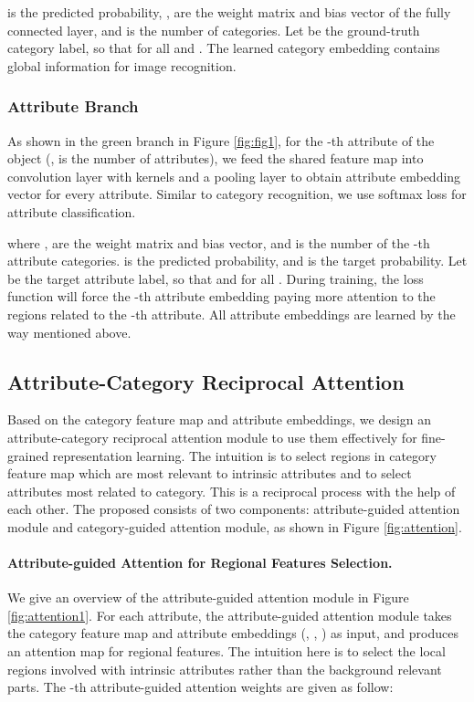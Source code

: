\documentclass[sigconf]{acmart}
\begin{document}
 is the predicted probability, ,  are the weight matrix and bias vector of the fully connected layer, and  is the number of categories. Let  be the ground-truth category label, so that  for all  and . The learned category embedding  contains global information for image recognition.

\vspace{-0.03cm}
\subsubsection{Attribute Branch}
As shown in the green branch in Figure \ref{fig:fig1}, for the -th attribute of the object (,  is the number of attributes), we feed the shared feature map into convolution layer with   kernels and a pooling layer to obtain attribute embedding vector  for every attribute. Similar to category recognition, we use softmax loss for attribute classification.
\vspace{0.05cm}


where ,  are the weight matrix and bias vector, and  is the number of the -th attribute categories.  is the predicted probability, and  is the target probability. Let  be the target attribute label, so that  and  for all . During training, the loss function will force the -th attribute embedding  paying more attention to the regions related to the -th attribute.  All  attribute embeddings are learned by the way mentioned above.

\subsection{Attribute-Category Reciprocal Attention}\label{ACRA}
Based on the category feature map and attribute embeddings, we design an attribute-category reciprocal attention module to use them effectively for fine-grained representation learning. The intuition is to select regions in category feature map which are most relevant to intrinsic attributes and to select attributes most related to category. This is a reciprocal process with the help of each other. The proposed  consists of two components: attribute-guided attention module and category-guided attention module, as shown in Figure \ref{fig:attention}.

\paragraph{Attribute-guided Attention for Regional Features Selection.}
We give an overview of the attribute-guided attention module in Figure \ref{fig:attention1}. For each attribute, the attribute-guided attention module takes the category feature map  and  attribute embeddings (, , ) as input, and produces an attention map for regional features. The intuition here is to select the local regions involved with intrinsic attributes rather than the background relevant parts. The -th attribute-guided attention weights are given as follow:
\end{document}
